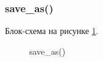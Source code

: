 \subsubsection{save\_as()}

Блок-схема на рисунке \ref{fig:save_as}.

\begin{figure}[p]
    \caption{save\_as()}
    \label{fig:save_as}
\end{figure}





\newpage